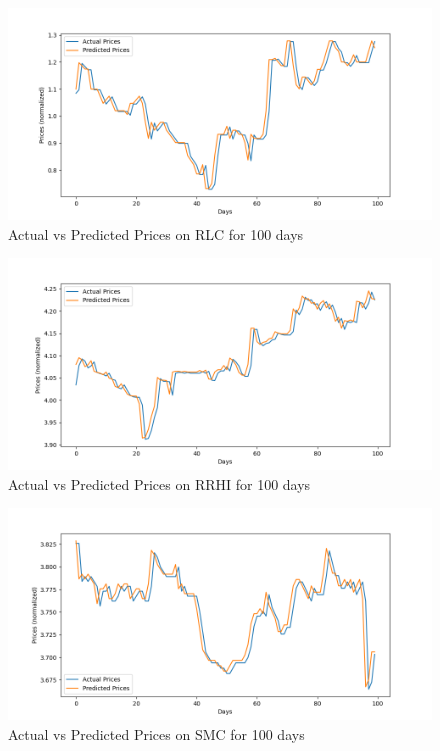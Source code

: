 \begin{figure}[ht]
    \centering
    \includegraphics[width=1\textwidth]{./assets/Chapter_4/DMD_LSTM_crossval/100days/RLC.png}
    \caption{Actual vs Predicted Prices on RLC for 100 days}
    \label{fig:crossval100_RLC}
\end{figure}
\FloatBarrier

\begin{figure}[ht]
    \centering
    \includegraphics[width=1\textwidth]{./assets/Chapter_4/DMD_LSTM_crossval/100days/RRHI.png}
    \caption{Actual vs Predicted Prices on RRHI for 100 days}
    \label{fig:crossval100_RRHI}
\end{figure}
\FloatBarrier

\begin{figure}[ht]
    \centering
    \includegraphics[width=1\textwidth]{./assets/Chapter_4/DMD_LSTM_crossval/100days/SMC.png}
    \caption{Actual vs Predicted Prices on SMC for 100 days}
    \label{fig:crossval100_SMC}
\end{figure}
\FloatBarrier

